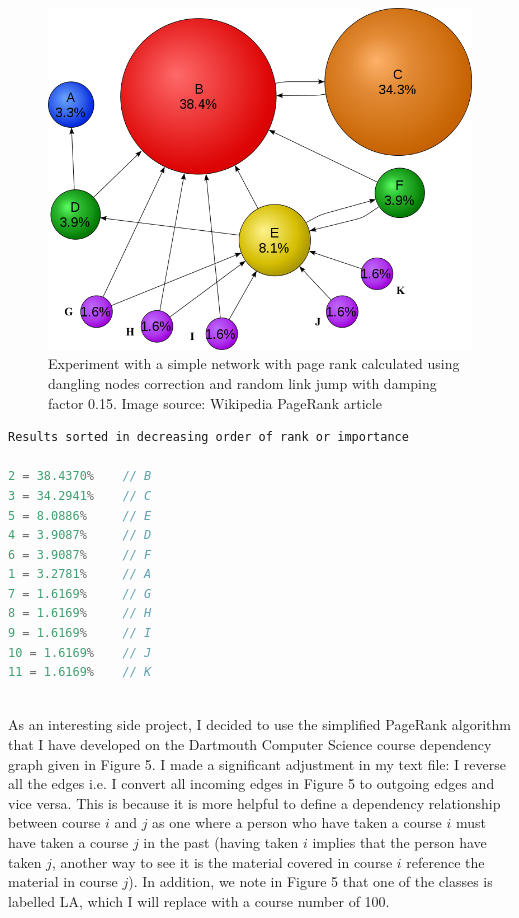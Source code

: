 \documentclass[9.5pt]{extarticle}
\begin{document}
\begin{figure}[H]
\centering
\includegraphics[scale=0.35]{page_rank_wiki.png}
\caption{Experiment with a simple network with page rank calculated using dangling nodes correction and random link jump with damping factor 0.15. Image source: Wikipedia PageRank article}
\label{Figure 4}
\end{figure}

\begin{lstlisting}[language=java,caption={Output for PageRank on medium graph with jumping}]
Results sorted in decreasing order of rank or importance

2 = 38.4370%	// B
3 = 34.2941%	// C
5 = 8.0886%	 	// E
4 = 3.9087%		// D
6 = 3.9087%		// F
1 = 3.2781%		// A
7 = 1.6169%		// G
8 = 1.6169%		// H
9 = 1.6169%		// I
10 = 1.6169%	// J
11 = 1.6169%	// K

\end{lstlisting}
~\\

As an interesting side project, I decided to use the simplified PageRank algorithm that I have developed on the Dartmouth Computer Science course dependency graph given in Figure 5. I made a significant adjustment in my text file: I reverse all the edges i.e. I convert all incoming edges in Figure 5 to outgoing edges and vice versa. This is because it is more helpful to define a dependency relationship between course $i$ and $j$ as one where a person who have taken a course $i$ must have taken a course $j$ in the past (having taken $i$ implies that the person have taken $j$, another way to see it is the material covered in course $i$ reference the material in course $j$). In addition, we note in Figure 5 that one of the classes is labelled LA, which I will replace with a course number of 100. \\
\end{document}
